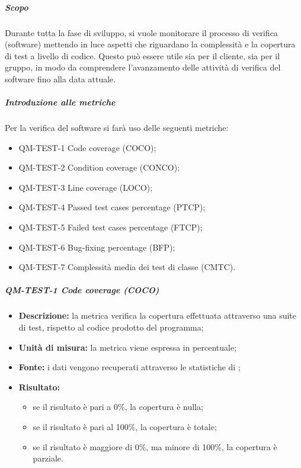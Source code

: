         \subparagraph{Scopo}

            Durante tutta la fase di sviluppo, si vuole monitorare il processo di verifica (software) mettendo in luce aspetti che riguardano la complessità e la copertura di test a livello di codice. Questo può essere utile sia per il cliente, sia per il gruppo, in modo da comprendere l'avanzamento delle attività di verifica del software fino alla data attuale.

        \subparagraph{Introduzione alle metriche}

             Per la verifica del software si farà uso delle seguenti metriche:

            \begin{itemize}
                \item QM-TEST-1 Code coverage (COCO);
                \item QM-TEST-2 Condition coverage (CONCO);
                \item QM-TEST-3 Line coverage (LOCO);
                \item QM-TEST-4 Passed test cases percentage (PTCP);
                \item QM-TEST-5 Failed test cases percentage (FTCP);
                \item QM-TEST-6 Bug-fixing percentage (BFP);
                \item QM-TEST-7 Complessità media dei test di classe (CMTC).
            \end{itemize}

                
            \subparagraph{QM-TEST-1 Code coverage (COCO)}
            \begin{itemize}
                \item \textbf{Descrizione: }
                    la metrica verifica la copertura effettuata attraverso una suite di test, rispetto al codice prodotto del programma;

                \item \textbf{Unità di misura: }
                	la metrica viene espressa in percentuale;

                \item \textbf{Fonte: }
                    i dati vengono recuperati attraverso le statistiche di ;

                \item \textbf{Risultato: }
                \begin{itemize}
                    \item se il risultato è pari a 0\%, la copertura è nulla;
                    \item se il risultato è pari al 100\%, la copertura è totale;
                    \item se il risultato è maggiore di 0\%, ma minore di 100\%, la copertura è parziale.
                \end{itemize}
            \end{itemize}



